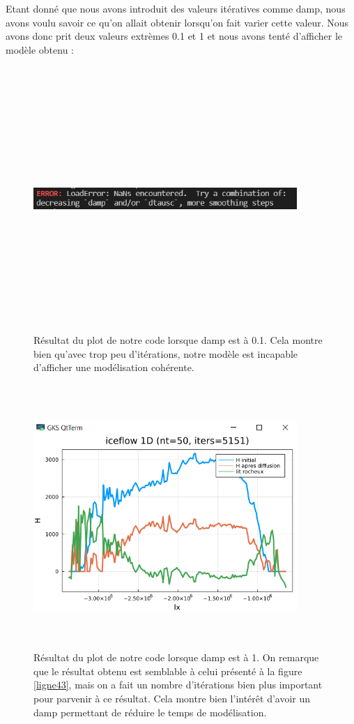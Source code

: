 \documentclass{article}
\begin{document}
Etant donné que nous avons introduit des valeurs itératives comme damp, nous avons voulu savoir ce qu'on allait obtenir lorsqu'on fait varier cette valeur. Nous avons donc prit deux valeurs extrèmes 0.1 et 1 et nous avons tenté d'afficher le modèle obtenu :
\begin{figure}[!htpb]
\centering
\includegraphics[width=10cm, keepaspectratio=true, height=10cm]{Damp01.png}
\caption{Résultat du plot de notre code lorsque damp est à 0.1. Cela montre bien qu'avec trop peu d'itérations, notre modèle est incapable d'afficher une modélisation cohérente.}
\end{figure}

\begin{figure}[!htpb]
\centering
\includegraphics[width=10cm, keepaspectratio=true, height=10cm]{Damp1.png}
\caption{Résultat du plot de notre code lorsque damp est à 1. On remarque que le résultat obtenu est semblable à celui présenté à la figure \ref{ligne43}, mais on a fait un nombre d'itérations bien plus important pour parvenir à ce résultat. Cela montre bien l'intérêt d'avoir un damp permettant de réduire le temps de modélisation.}
\end{figure}
\newpage


\end{document}
